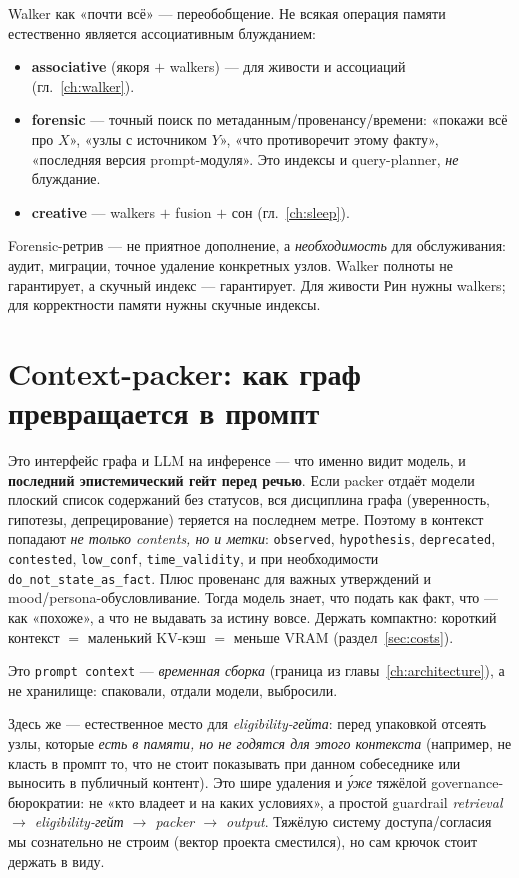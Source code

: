 Walker как «почти всё» — переобобщение. Не всякая операция памяти естественно
является ассоциативным блужданием:
\begin{itemize}\itemsep1pt
\item \textbf{associative} (якоря $+$ walkers) — для живости и ассоциаций (гл.~\ref{ch:walker}).
\item \textbf{forensic} — точный поиск по метаданным/провенансу/времени: «покажи всё
про $X$», «узлы с источником $Y$», «что противоречит этому факту», «последняя версия
prompt-модуля». Это индексы и query-planner, \emph{не} блуждание.
\item \textbf{creative} — walkers $+$ fusion $+$ сон (гл.~\ref{ch:sleep}).
\end{itemize}
Forensic-ретрив — не приятное дополнение, а \emph{необходимость} для обслуживания:
аудит, миграции, точное удаление конкретных узлов. Walker полноты не гарантирует, а
скучный индекс — гарантирует. Для живости Рин нужны walkers; для корректности памяти
нужны скучные индексы.

\section{Context-packer: как граф превращается в промпт}
\label{sec:packer}

Это интерфейс графа и LLM на инференсе — что именно видит модель, и
\textbf{последний эпистемический гейт перед речью}. Если packer отдаёт модели плоский
список содержаний без статусов, вся дисциплина графа (уверенность, гипотезы,
депрецирование) теряется на последнем метре. Поэтому в контекст попадают \emph{не
только contents, но и метки}: \texttt{observed}, \texttt{hypothesis},
\texttt{deprecated}, \texttt{contested}, \texttt{low\_conf}, \texttt{time\_validity},
и при необходимости \texttt{do\_not\_state\_as\_fact}. Плюс провенанс для важных
утверждений и mood/persona-обусловливание. Тогда модель знает, что подать как факт,
что — как «похоже», а что не выдавать за истину вовсе. Держать компактно: короткий
контекст $=$ маленький KV-кэш $=$ меньше VRAM (раздел~\ref{sec:costs}).

Это \texttt{prompt context} — \emph{временная сборка} (граница из
главы~\ref{ch:architecture}), а не хранилище: спаковали, отдали модели, выбросили.

Здесь же — естественное место для \emph{eligibility-гейта}: перед упаковкой отсеять
узлы, которые \emph{есть в памяти, но не годятся для этого контекста} (например, не
класть в промпт то, что не стоит показывать при данном собеседнике или выносить в
публичный контент). Это шире удаления и \emph{у́же} тяжёлой governance-бюрократии:
не «кто владеет и на каких условиях», а простой guardrail
\emph{retrieval $\to$ eligibility-гейт $\to$ packer $\to$ output}. Тяжёлую систему
доступа/согласия мы сознательно не строим (вектор проекта сместился), но сам крючок
стоит держать в виду.

